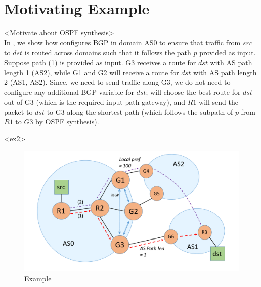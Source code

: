 \section{Motivating Example}
<Motivate about OSPF synthesis> \\
In , we show how \name configures BGP in domain AS0 
to ensure that traffic from $src$ to $dst$ is routed across domains 
such that it follows the path $p$ provided as input. Suppose path (1) is
provided as input. G3 receives a route for $dst$ with AS path length 1
(AS2), while G1 and G2 will receive a route for $dst$ with 
AS path length 2 (AS1, AS2). Since, we need to send traffic along
G3, we do not need to configure any additional BGP variable for $dst$;
 will choose the best route for $dst$ 
out of G3 (which is the required input path gateway), and $R1$ will
send the packet to $dst$ to G3 along the shortest path (which 
follows the subpath of $p$ from $R1$ to $G3$ by OSPF synthesis). 

<ex2>




\begin{figure}[!t] 
	\centering
	\includegraphics[width=\columnwidth]{figures/bgp-example.pdf}
	\caption{Example} \label{fig:bgpeg}
\end{figure}

